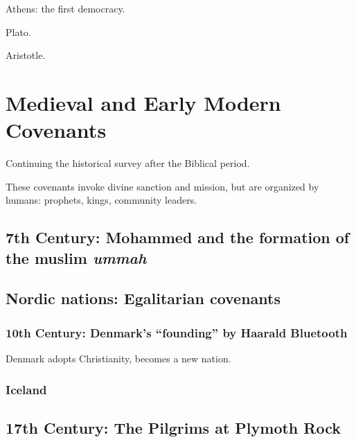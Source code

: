 \documentclass[
]{book}
\begin{document}
Athens: the first democracy.

Plato.

Aristotle.

\hypertarget{medieval-and-early-modern-covenants}{%
\chapter{Medieval and Early Modern Covenants}\label{medieval-and-early-modern-covenants}}

Continuing the historical survey after the Biblical period.

These covenants invoke divine sanction and mission, but are organized by humans: prophets, kings, community leaders.

\hypertarget{th-century-mohammed-and-the-formation-of-the-muslim-ummah}{%
\section{\texorpdfstring{7th Century: Mohammed and the formation of the muslim \emph{ummah}}{7th Century: Mohammed and the formation of the muslim ummah}}\label{th-century-mohammed-and-the-formation-of-the-muslim-ummah}}

\hypertarget{nordic-nations-egalitarian-covenants}{%
\section{Nordic nations: Egalitarian covenants}\label{nordic-nations-egalitarian-covenants}}

\hypertarget{th-century-denmarks-founding-by-haarald-bluetooth}{%
\subsection{10th Century: Denmark's ``founding'' by Haarald Bluetooth}\label{th-century-denmarks-founding-by-haarald-bluetooth}}

Denmark adopts Christianity, becomes a new nation.

\hypertarget{iceland}{%
\subsection{Iceland}\label{iceland}}

\hypertarget{th-century-the-pilgrims-at-plymoth-rock}{%
\section{17th Century: The Pilgrims at Plymoth Rock}\label{th-century-the-pilgrims-at-plymoth-rock}}
\end{document}
